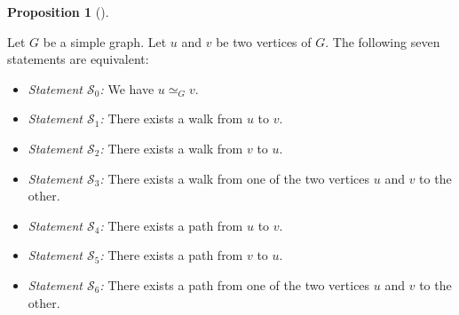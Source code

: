 \documentclass[numbers=enddot,12pt,final,onecolumn,notitlepage]{scrartcl}%
\theoremstyle{definition}
\newtheorem{prop}[theo]{Proposition}
\newenvironment{proposition}[1][]
{\begin{prop}[#1]\begin{leftbar}}
{\end{leftbar}\end{prop}}
\begin{document}
\begin{proposition} \label{prop.intro.paths-and-walks}
Let $G$ be a simple graph. Let $u$ and $v$ be two vertices of $G$.
The following seven statements are equivalent:

\begin{itemize}
\item \textit{Statement $\mathcal{S}_0$:} We have $u \simeq_G v$.

\item \textit{Statement $\mathcal{S}_1$:}
There exists a walk from $u$ to $v$.

\item \textit{Statement $\mathcal{S}_2$:}
There exists a walk from $v$ to $u$.

\item \textit{Statement $\mathcal{S}_3$:}
There exists a walk from one of the two vertices $u$ and $v$ to the
other.

\item \textit{Statement $\mathcal{S}_4$:}
There exists a path from $u$ to $v$.

\item \textit{Statement $\mathcal{S}_5$:}
There exists a path from $v$ to $u$.

\item \textit{Statement $\mathcal{S}_6$:}
There exists a path from one of the two
vertices $u$ and $v$ to the other.
\end{itemize}
\end{proposition}
\end{document}
